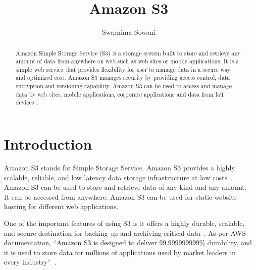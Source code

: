 
\title{Amazon S3}


\author{Swarnima Sowani}

\renewcommand{\shortauthors}{G. v. Laszewski}

\begin{abstract}

Amazon Simple Storage Service (S3) is a storage system built to store and
retrieve any amount of data from anywhere on web such as web sites or mobile
applications. It is a simple web service that provides flexibility for user to
manage data in a secure way and optimized cost. Amazon S3 manages security by
providing access control, data encryption and versioning capability. Amazon S3
can be used to access and manage data by web sites, mobile applications,
corporate applications and data from IoT devices~\cite{hid-sp18-420-amazon-S3}.

\end{abstract}


\maketitle

\section{Introduction}

Amazon S3 stands for Simple Storage Service. Amazon S3 provides a highly
scalable, reliable, and low latency data storage infrastructure at low
costs~\cite{hid-sp18-420-amazon-S3-FAQ}. Amazon S3 can be used to store and
retrieve data of any kind and any amount. It can be accessed from anywhere.
Amazon S3 can be used for static website hosting for different web applications.

One of the important features of using S3 is it offers a highly durable,
scalable, and secure destination for backing up and archiving critical
data~\cite{hid-sp18-420-amazon-S3}. As per AWS documentation, ``Amazon S3 is
designed to deliver 99.999999999\% durability, and it is used to store data for
millions of applications used by market leaders in every
industry''~\cite{hid-sp18-420-amazon-S3}.

